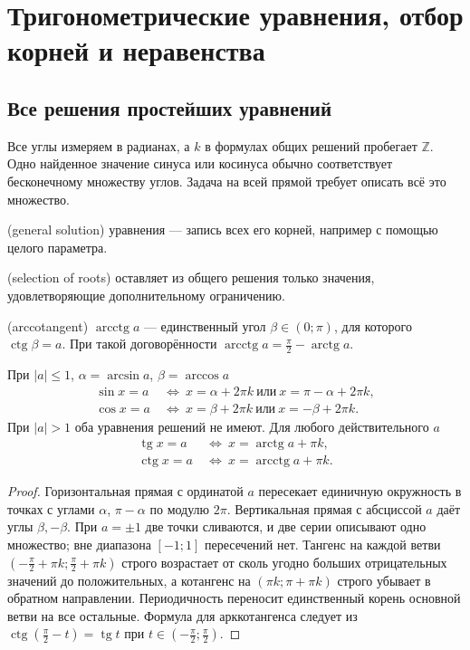 \chapter{Тригонометрические уравнения, отбор корней и неравенства}\label{chap:exam-trigonometric}
\section{Все решения простейших уравнений}
Все углы измеряем в радианах, а \(k\) в формулах общих решений пробегает \(\mathbb Z\). Одно найденное значение синуса или косинуса обычно соответствует бесконечному множеству углов. Задача на всей прямой требует описать всё это множество.
\begin{definition} (general solution) уравнения — запись всех его корней, например с помощью целого параметра.\end{definition}
\begin{definition} (selection of roots) оставляет из общего решения только значения, удовлетворяющие дополнительному ограничению.\end{definition}
\begin{definition} (arccotangent) \(\operatorname{arcctg}a\) — единственный угол \(\beta\in(0;\pi)\), для которого \(\operatorname{ctg}\beta=a\). При такой договорённости \(\operatorname{arcctg}a=\frac\pi2-\operatorname{arctg}a\).\end{definition}
\begin{theorem}
При \(|a|\leq1\), \(\alpha=\arcsin a\), \(\beta=\arccos a\)
\[
\begin{aligned}
\sin x=a&\ \Longleftrightarrow\ x=\alpha+2\pi k\ \text{или}\ x=\pi-\alpha+2\pi k,\\
\cos x=a&\ \Longleftrightarrow\ x=\beta+2\pi k\ \text{или}\ x=-\beta+2\pi k.
\end{aligned}
\]
При \(|a|>1\) оба уравнения решений не имеют. Для любого действительного \(a\)
\[
\begin{aligned}
\operatorname{tg}x=a&\ \Longleftrightarrow\ x=\operatorname{arctg}a+\pi k,\\
\operatorname{ctg}x=a&\ \Longleftrightarrow\ x=\operatorname{arcctg}a+\pi k.
\end{aligned}
\]
\end{theorem}
\begin{proof}Горизонтальная прямая с ординатой \(a\) пересекает единичную окружность в точках с углами \(\alpha\), \(\pi-\alpha\) по модулю \(2\pi\). Вертикальная прямая с абсциссой \(a\) даёт углы \(\beta,-\beta\). При \(a=\pm1\) две точки сливаются, и две серии описывают одно множество; вне диапазона \([-1;1]\) пересечений нет. Тангенс на каждой ветви \((-\frac\pi2+\pi k;\frac\pi2+\pi k)\) строго возрастает от сколь угодно больших отрицательных значений до положительных, а котангенс на \((\pi k;\pi+\pi k)\) строго убывает в обратном направлении. Периодичность переносит единственный корень основной ветви на все остальные. Формула для арккотангенса следует из \(\operatorname{ctg}(\frac\pi2-t)=\operatorname{tg}t\) при \(t\in(-\frac\pi2;\frac\pi2)\).\end{proof}
